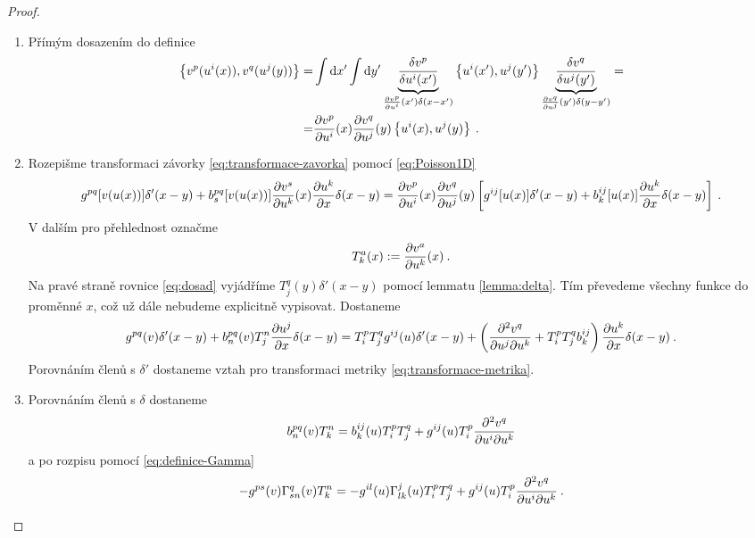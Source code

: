 \begin{proof}
    \begin{enumerate}
        \item Přímým dosazením do definice
        \begin{align}
            \left \lbrace v^p(u^i(x)),v^q(u^j(y)) \right \rbrace 
            =& \int \mathrm{d} x' \int \mathrm{d} y' \underbrace{\frac{\delta v^p}{\delta u^i(x')} }_{\frac{\partial v^p}{\partial u^i}(x') \delta(x-x')} \left \lbrace u^i(x'),u^j(y') \right \rbrace \underbrace{\frac{\delta v^q}{\delta u^j(y')} }_{\frac{\partial v^q}{\partial u^j}(y') \delta(y-y')}
            = \\ =& \frac{\partial v^p}{\partial u^i}(x) \frac{\partial v^q}{\partial u^j}(y) \left \lbrace u^i(x),u^j(y) \right \rbrace \:.
        \end{align}
        \item Rozepišme transformaci závorky \eqref{eq:transformace-zavorka} pomocí \eqref{eq:Poisson1D}
        \begin{align}
            g^{pq}[v(u(x))] \delta'(x-y) + b^{pq}_s[v(u(x))] \frac{\partial v^s}{\partial u^k}(x) \frac{\partial u^k}{\partial x} \delta(x-y)
            = \frac{\partial v^p}{\partial u^i}(x) \frac{\partial v^q}{\partial u^j}(y) \left[ g^{ij}[u(x)] \delta'(x-y) + b^{ij}_k[u(x)] \frac{\partial u^k}{\partial x} \delta(x-y) \right] \:. \label{eq:dosad}
        \end{align}
        V dalším pro přehlednost označme
        \begin{align}
            T^a_k(x) := \frac{\partial v^a}{\partial u^k}(x) \:.
        \end{align}
        Na pravé straně rovnice \eqref{eq:dosad} vyjádříme $T^q_j(y) \delta'(x-y)$ pomocí lemmatu \vref{lemma:delta}. Tím převedeme všechny funkce do proměnné $x$, což už dále nebudeme explicitně vypisovat. Dostaneme
        \begin{align}
            g^{pq}(v) \delta'(x-y) + b^{pq}_n(v) T^n_j \frac{\partial u^j}{\partial x} \delta(x-y) 
            = T^p_i T^q_j g^{ij}(u) \delta'(x-y) 
            + \left( \frac{\partial^2 v^q}{\partial u^j \partial u^k} + T^p_i T^q_j b^{ij}_k \right) \frac{\partial u^k}{\partial x} \delta(x-y) \:.
        \end{align}
        Porovnáním členů s $\delta'$ dostaneme vztah pro transformaci metriky \eqref{eq:transformace-metrika}.
        \item Porovnáním členů s $\delta$ dostaneme
        \begin{align}
            b^{pq}_n(v) T^n_k =
            b^{ij}_k(u) T^p_i T^q_j + g^{ij}(u) T^p_i \frac{\partial^2 v^q}{\partial u^i \partial u^k}
        \end{align}
        a po rozpisu pomocí \eqref{eq:definice-Gamma}
        \begin{align}
            - g^{ps}(v) \Gamma^{q}_{sn}(v) T^n_k =
            - g^{il}(u) \Gamma^j_{lk}(u) T^p_i T^q_j + g^{ij}(u) T^p_i \ppder{v^q}{u^i}{u^k} \:.

\end{align}
\end{enumerate}
\end{proof}
